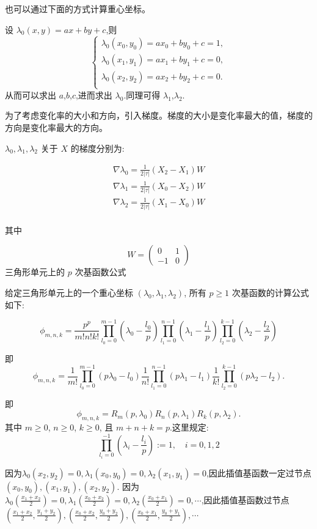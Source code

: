 \documentclass[12pt,a4paper]{article}
\begin{document}
也可以通过下面的方式计算重心坐标。

设 $\lambda_0 (x,y)=ax+by+c$,则
$$
\begin{cases}
\lambda _0 (x_0,y_0)=ax_0+by_0+c=1,\\
\lambda _0 (x_1,y_1)=ax_1+by_1+c=0,\\
\lambda _0 (x_2,y_2)=ax_2+by_2+c=0.\\
\end{cases}
$$
从而可以求出 $a$,$b$,$c$,进而求出 $\lambda _0$.同理可得 $\lambda _1$,$\lambda _2$.

为了考虑变化率的大小和方向，引入梯度。梯度的大小是变化率最大的值，梯度的方向是变化率最大的方向。

$\lambda_0, \lambda_1, \lambda_2$ 关于 $X$ 的梯度分别为:

$$
\begin{aligned}
\nabla\lambda_0 = \frac{1}{2|\tau|}(X_2 - X_1)W\\
\nabla\lambda_1 = \frac{1}{2|\tau|}(X_0 - X_2)W\\
\nabla\lambda_2 = \frac{1}{2|\tau|}(X_1 - X_0)W\\
\end{aligned}
$$

其中 

$$
W = \begin{pmatrix}
0 & 1\\ -1 & 0 
\end{pmatrix}
$$
三角形单元上的 $p$ 次基函数公式

给定三角形单元上的一个重心坐标 $(\lambda_0, \lambda_1, \lambda_2)$, 所有 $p\geq 1$ 次基函数的计算公式如下:

$$
\phi_{m,n,k} = \frac{p^p}{m!n!k!}\prod_{l_0 = 0}^{m - 1}
(\lambda_0 - \frac{l_0}{p}) \prod_{l_1 = 0}^{n-1}(\lambda_1 -
\frac{l_1}{p}) \prod_{l_2=0}^{k-1}(\lambda_2 - \frac{l_2}{p})
$$

即
$$
\phi_{m,n,k} =\frac{1}{m!}\prod_{l_0 = 0}^{m - 1}(p\lambda_0 - l_0)\frac{1}{n!}\prod_{l_1 = 0}^{n - 1}(p\lambda_1 - l_1)\frac{1}{k!}\prod_{l_2 = 0}^{k - 1}(p\lambda_2 - l_2).
$$

即
$$
\phi_{m,n,k} =R_m (p,\lambda_0)R_n (p,\lambda_1)R_k (p,\lambda_2).
$$
其中 $ m\geq 0$, $n\geq 0$, $ k \geq 0$, 且 $m+n+k=p$.这里规定:
$$
 \prod_{l_i=0}^{-1}(\lambda_i - \frac{l_i}{p}) := 1,\quad i=0, 1, 2
$$

因为$\lambda_0 (x_2,y_2) = 0,\lambda_1 (x_0,y_0) = 0,\lambda_2 (x_1,y_1) = 0$,因此插值基函数一定过节点$(x_0,y_0),(x_1,y_1),(x_2,y_2).$
因为$\lambda_0 (\frac{x_1+x_2}{2}) = 0,\lambda_1 (\frac{x_0+x_2}{2}) = 0,\lambda_2 (\frac{x_0+x_1}{2}) = 0,\cdots $,因此插值基函数过节点$(\frac{x_1+x_2}{2},\frac{y_1+y_2}{2}),(\frac{x_0+x_2}{2},\frac{y_0+y_2}{2}),(\frac{x_0+x_1}{2},\frac{y_0+y_1}{2}),\cdots $
\end{document}
